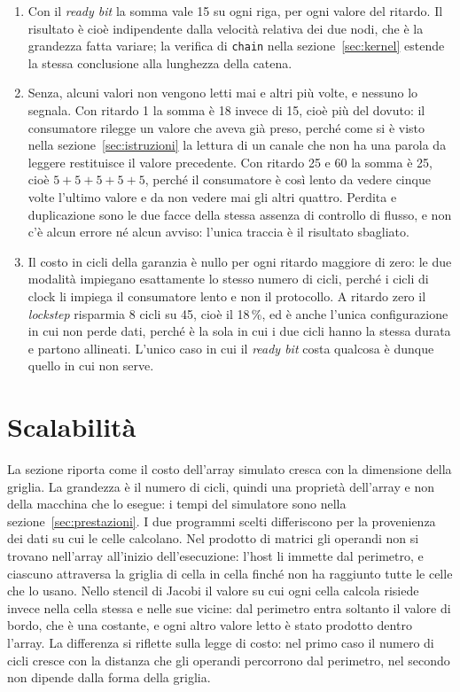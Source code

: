 \begin{enumerate}
    \item Con il \emph{ready bit} la somma vale 15 su ogni riga, per ogni valore
          del ritardo. Il risultato è cioè indipendente dalla velocità relativa
          dei due nodi, che è la grandezza fatta variare; la verifica di
          \texttt{chain} nella sezione~\ref{sec:kernel} estende la stessa
          conclusione alla lunghezza della catena.
    \item Senza, alcuni valori non vengono letti mai e altri più volte, e
          nessuno lo segnala. Con ritardo 1 la somma è 18 invece di 15, cioè
          più del dovuto: il consumatore rilegge un valore che aveva già preso,
          perché come si è visto nella sezione~\ref{sec:istruzioni} la lettura di un canale che non ha una parola da leggere restituisce il
          valore precedente. Con ritardo 25 e 60 la
          somma è 25, cioè $5+5+5+5+5$, perché il consumatore è così lento da
          vedere cinque volte l'ultimo valore e da non vedere mai gli altri
          quattro. Perdita e duplicazione sono le due facce della stessa
          assenza di controllo di flusso, e non c'è alcun errore né alcun
          avviso: l'unica traccia è il risultato sbagliato.
    \item Il costo in cicli della garanzia è nullo per ogni ritardo maggiore di
          zero: le due modalità impiegano esattamente lo stesso numero di
          cicli, perché i cicli di clock li impiega il consumatore lento e non il
          protocollo. A ritardo zero il \emph{lockstep} risparmia 8 cicli su
          45, cioè il 18\,\%, ed è anche l'unica configurazione in cui non
          perde dati, perché è la sola in cui i due cicli hanno la stessa
          durata e partono allineati. L'unico caso in cui il \emph{ready bit} costa qualcosa è
          dunque quello in cui non serve.
\end{enumerate}

\section{Scalabilità}
\label{sec:scalabilita}

La sezione riporta come il costo dell'array simulato cresca con la dimensione
della griglia. La grandezza è il numero di cicli, quindi una proprietà
dell'array e non della macchina che lo esegue: i tempi del simulatore sono
nella sezione~\ref{sec:prestazioni}. I due programmi scelti differiscono per
la provenienza dei dati su cui le celle calcolano. Nel prodotto di matrici gli
operandi non si trovano nell'array all'inizio dell'esecuzione: l'host li
immette dal perimetro, e ciascuno attraversa la griglia di cella in cella
finché non ha raggiunto tutte le celle che lo usano. Nello stencil di Jacobi il
valore su cui ogni cella calcola risiede invece nella cella stessa e nelle sue
vicine: dal perimetro entra soltanto il valore di bordo, che è una costante, e
ogni altro valore letto è stato prodotto dentro l'array. La differenza si
riflette sulla legge di costo: nel primo caso il numero di cicli cresce con la
distanza che gli operandi percorrono dal perimetro, nel secondo non dipende
dalla forma della griglia.



